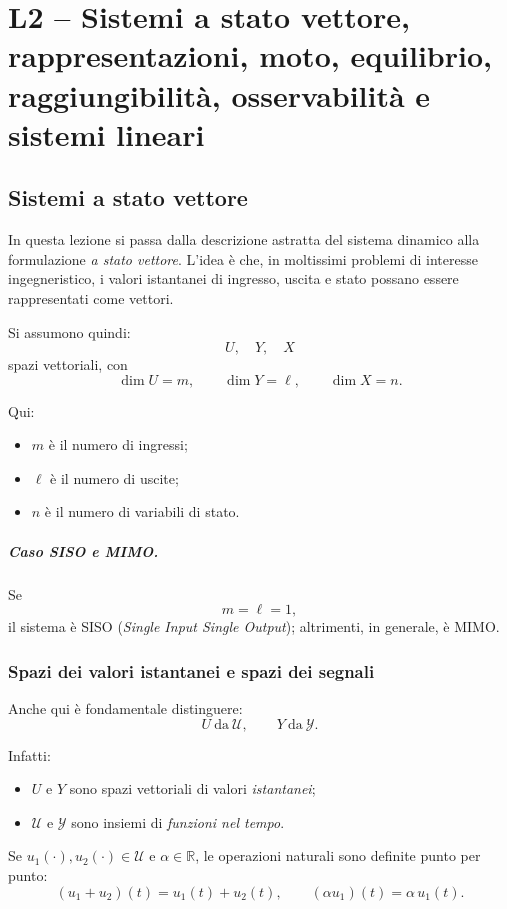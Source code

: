 \chapter{L2 -- Sistemi a stato vettore, rappresentazioni, moto, equilibrio, raggiungibilità, osservabilità e sistemi lineari}

\section{Sistemi a stato vettore}

In questa lezione si passa dalla descrizione astratta del sistema dinamico alla formulazione \emph{a stato vettore}.  
L'idea è che, in moltissimi problemi di interesse ingegneristico, i valori istantanei di ingresso, uscita e stato possano essere rappresentati come vettori.

Si assumono quindi:
\[
U,\quad Y,\quad X
\]
spazi vettoriali, con
\[
\dim U = m,\qquad \dim Y = \ell,\qquad \dim X = n.
\]

Qui:
\begin{itemize}
    \item $m$ è il numero di ingressi;
    \item $\ell$ è il numero di uscite;
    \item $n$ è il numero di variabili di stato.
\end{itemize}

\paragraph{Caso SISO e MIMO.}
Se
\[
m=\ell=1,
\]
il sistema è SISO (\emph{Single Input Single Output}); altrimenti, in generale, è MIMO.

\subsection{Spazi dei valori istantanei e spazi dei segnali}

Anche qui è fondamentale distinguere:
\[
U \ \text{da}\ \mathcal{U},
\qquad
Y \ \text{da}\ \mathcal{Y}.
\]

Infatti:
\begin{itemize}
    \item $U$ e $Y$ sono spazi vettoriali di valori \emph{istantanei};
    \item $\mathcal{U}$ e $\mathcal{Y}$ sono insiemi di \emph{funzioni nel tempo}.
\end{itemize}

Se $u_1(\cdot),u_2(\cdot)\in\mathcal{U}$ e $\alpha\in\mathbb{R}$, le operazioni naturali sono definite punto per punto:
\[
(u_1+u_2)(t)=u_1(t)+u_2(t),
\qquad
(\alpha u_1)(t)=\alpha\,u_1(t).
\]

